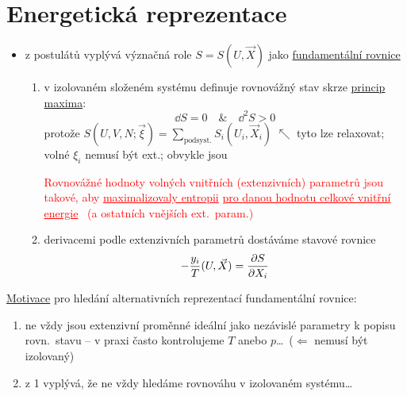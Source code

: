 \section{Energetická reprezentace}

\begin{itemize}
  \item z postulátů vyplývá význačná role $S = S(U,\vec X)$ jako \underline{fundamentální rovnice}
  \begin{enumerate}[label=\roman*)]
    \item v izolovaném složeném systému definuje rovnovážný stav skrze \underline{princip maxima}:
    \[
      \dd S = 0 \quad\&\quad \dd^2S > 0
    \]
    \textcolor{NavyBlue}{\small protože $S(U,V,N;\vec\xi) = \sum_{\text{podsyst.}}S_i(U_i,\vec X_i)$ \qquad
    $\nwarrow$ tyto lze relaxovat; volné $\xi_i$ nemusí být ext.; obvykle jsou}

    \begin{veta}
    \textcolor{Red}{Rovnovážné hodnoty volných vnitřních \textcolor{NavyBlue}{(}extenzivních\textcolor{NavyBlue}{)} parametrů jsou takové, aby \underline{maximalizovaly entropii} \underline{pro danou hodnotu celkové vnitřní energie}} \
    \textcolor{Red}{\small (a ostatních vnějších ext.\ param.)}
    \end{veta}

    \item derivacemi podle extenzivních parametrů dostáváme stavové rovnice
    \[
      -\frac{y_i}{T}(U,\vec X) = \pdv{S}{X_i}
    \]
  \end{enumerate}
\end{itemize}

\underline{Motivace} pro hledání alternativních reprezentací fundamentální rovnice:
\begin{enumerate}[label=\arabic*)]
  \item ne vždy jsou extenzivní proměnné ideální jako nezávislé parametry k popisu rovn.\ stavu -- v praxi často kontrolujeme $T$ anebo $p$\dots\ \textcolor{NavyBlue}{($\Leftarrow$  nemusí být izolovaný)}
  \item z 1 vyplývá, že ne vždy hledáme rovnováhu v izolovaném systému\dots
\end{enumerate}

\strana{L04c-2}
